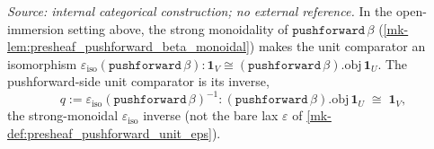 \begin{definition}\label{mk-def:presheaf_pushforward_unit_iso}
  \leanok

  \textit{Source: internal categorical construction; no external reference.}
  In the open-immersion setting above, the strong monoidality of \(\mathtt{pushforward}\,\beta\)
  (\ref{mk-lem:presheaf_pushforward_beta_monoidal}) makes the unit comparator an isomorphism
  \(\varepsilon_{\mathrm{iso}}(\mathtt{pushforward}\,\beta) :
    \mathbf 1_V \cong (\mathtt{pushforward}\,\beta).\mathrm{obj}\,\mathbf 1_U\). The pushforward-side
  unit comparator is its inverse,
  \[
    q := \varepsilon_{\mathrm{iso}}(\mathtt{pushforward}\,\beta)^{-1} :
      (\mathtt{pushforward}\,\beta).\mathrm{obj}\,\mathbf 1_U \;\cong\; \mathbf 1_V ,
  \]
  the strong-monoidal \(\varepsilon_{\mathrm{iso}}\) inverse (not the bare lax \(\varepsilon\) of
  \ref{mk-def:presheaf_pushforward_unit_eps}).
\end{definition}

